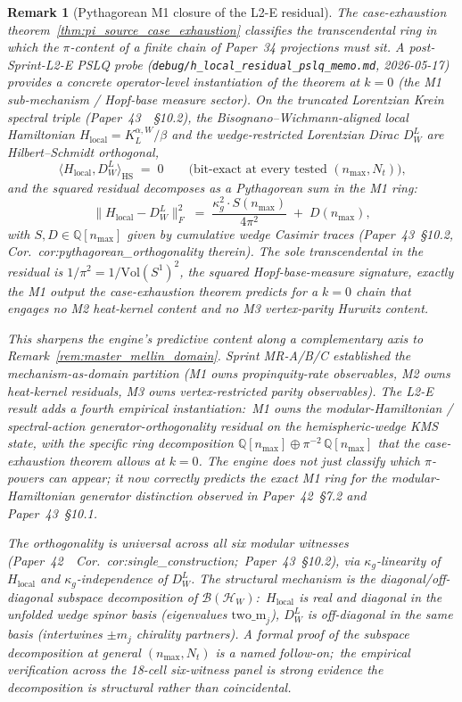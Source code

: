 \documentclass[11pt]{article}
\newtheorem{remark}{Remark}
\begin{document}
\begin{remark}[Pythagorean M1 closure of the L2-E residual]
\label{rem:pythagorean_m1_closure}
The case-exhaustion theorem~\ref{thm:pi_source_case_exhaustion}
classifies the transcendental ring in which the $\pi$-content of a
finite chain of Paper~34 projections must sit.  A
post-Sprint-L2-E PSLQ probe (\texttt{debug/h\_local\_residual\_pslq\_memo.md},
2026-05-17) provides a concrete operator-level instantiation of the
theorem at $k = 0$ (the M1 sub-mechanism / Hopf-base measure sector).
On the truncated Lorentzian Krein spectral triple
(Paper~43~\cite{paper43}~\S 10.2), the
Bisognano--Wichmann-aligned local Hamiltonian
$H_{\mathrm{local}} = K^{\alpha, W}_L / \beta$ and the
wedge-restricted Lorentzian Dirac $D_W^L$ are Hilbert--Schmidt
orthogonal,
\[
   \langle H_{\mathrm{local}}, D_W^L \rangle_{\mathrm{HS}}
   \;=\; 0
   \qquad \text{(bit-exact at every tested $(n_{\max}, N_t)$),}
\]
and the squared residual decomposes as a Pythagorean sum in the M1
ring:
\[
   \big\| H_{\mathrm{local}} - D_W^L \big\|_F^2
   \;=\; \frac{\kappa_g^2 \cdot S(n_{\max})}{4\pi^2}
       \;+\; D(n_{\max}),
\]
with $S, D \in \mathbb{Q}[n_{\max}]$ given by cumulative wedge
Casimir traces (Paper~43~\S 10.2,
Cor.~cor:pythagorean\_orthogonality therein).  The sole
transcendental in the residual is $1/\pi^2 = 1/\mathrm{Vol}(S^1)^2$,
the squared Hopf-base-measure signature, exactly the M1 output the
case-exhaustion theorem predicts for a $k = 0$ chain that engages no
M2 heat-kernel content and no M3 vertex-parity Hurwitz content.

This sharpens the engine's predictive content along a complementary
axis to Remark~\ref{rem:master_mellin_domain}.  Sprint MR-A/B/C
established the mechanism-as-domain partition (M1 owns
propinquity-rate observables, M2 owns heat-kernel residuals, M3 owns
vertex-restricted parity observables).  The L2-E result adds a
fourth empirical instantiation:\ M1 owns the modular-Hamiltonian /
spectral-action generator-orthogonality residual on the
hemispheric-wedge KMS state, with the specific ring decomposition
$\mathbb{Q}[n_{\max}] \oplus \pi^{-2}\,\mathbb{Q}[n_{\max}]$ that
the case-exhaustion theorem allows at $k = 0$.  The engine does not
just classify which $\pi$-powers can appear; it now correctly
predicts the exact M1 ring for the modular-Hamiltonian generator
distinction observed in Paper~42~\S 7.2 and Paper~43~\S 10.1.

The orthogonality is universal across all six modular witnesses
(Paper~42~\cite{paper42}~Cor.~cor:single\_construction;\
Paper~43~\S 10.2), via $\kappa_g$-linearity of $H_{\mathrm{local}}$
and $\kappa_g$-independence of $D_W^L$.  The structural mechanism
is the diagonal/off-diagonal subspace decomposition of
$\mathcal{B}(\mathcal{H}_W)$:\ $H_{\mathrm{local}}$ is real and
diagonal in the unfolded wedge spinor basis (eigenvalues
$\mathrm{two\_m}_j$), $D_W^L$ is off-diagonal in the same basis
(intertwines $\pm m_j$ chirality partners).  A formal proof of the
subspace decomposition at general $(n_{\max}, N_t)$ is a named
follow-on;\ the empirical verification across the 18-cell
six-witness panel is strong evidence the decomposition is
structural rather than coincidental.


\end{remark}
\end{document}
